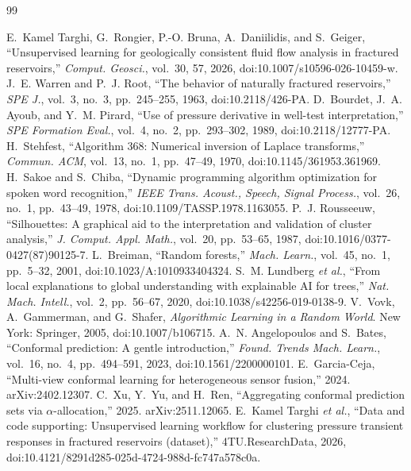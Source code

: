 \documentclass[journal]{IEEEtran}
\begin{document}
\begin{thebibliography}{99}
\itemsep 1pt

 E.~Kamel Targhi, G.~Rongier, P.-O. Bruna, A.~Daniilidis, and S.~Geiger,
``Unsupervised learning for geologically consistent fluid flow analysis in fractured reservoirs,''
\emph{Comput. Geosci.}, vol.~30, 57, 2026, doi:10.1007/s10596-026-10459-w.
 J.~E. Warren and P.~J. Root, ``The behavior of naturally fractured reservoirs,''
\emph{SPE J.}, vol.~3, no.~3, pp.~245--255, 1963, doi:10.2118/426-PA.
 D.~Bourdet, J.~A. Ayoub, and Y.~M. Pirard, ``Use of pressure derivative in
well-test interpretation,'' \emph{SPE Formation Eval.}, vol.~4, no.~2, pp.~293--302, 1989,
doi:10.2118/12777-PA.
 H.~Stehfest, ``Algorithm 368: Numerical inversion of Laplace transforms,''
\emph{Commun. ACM}, vol.~13, no.~1, pp.~47--49, 1970, doi:10.1145/361953.361969.
 H.~Sakoe and S.~Chiba, ``Dynamic programming algorithm optimization for spoken
word recognition,'' \emph{IEEE Trans. Acoust., Speech, Signal Process.}, vol.~26, no.~1,
pp.~43--49, 1978, doi:10.1109/TASSP.1978.1163055.
 P.~J. Rousseeuw, ``Silhouettes: A graphical aid to the interpretation and
validation of cluster analysis,'' \emph{J. Comput. Appl. Math.}, vol.~20, pp.~53--65, 1987,
doi:10.1016/0377-0427(87)90125-7.
 L.~Breiman, ``Random forests,'' \emph{Mach. Learn.}, vol.~45, no.~1,
pp.~5--32, 2001, doi:10.1023/A:1010933404324.
 S.~M. Lundberg \emph{et al.}, ``From local explanations to global
understanding with explainable AI for trees,'' \emph{Nat. Mach. Intell.}, vol.~2, pp.~56--67,
2020, doi:10.1038/s42256-019-0138-9.
 V.~Vovk, A.~Gammerman, and G.~Shafer, \emph{Algorithmic Learning in a Random
World}. New York: Springer, 2005, doi:10.1007/b106715.
 A.~N. Angelopoulos and S.~Bates, ``Conformal prediction: A gentle
introduction,'' \emph{Found. Trends Mach. Learn.}, vol.~16, no.~4, pp.~494--591, 2023,
doi:10.1561/2200000101.
 E.~Garcia-Ceja, ``Multi-view conformal learning for heterogeneous
sensor fusion,'' 2024. arXiv:2402.12307.
 C.~Xu, Y.~Yu, and H.~Ren, ``Aggregating conformal prediction sets via
$\alpha$-allocation,'' 2025. arXiv:2511.12065.
 E.~Kamel Targhi \emph{et al.}, ``Data and code supporting: Unsupervised learning
workflow for clustering pressure transient responses in fractured reservoirs (dataset),''
4TU.ResearchData, 2026,
doi:10.4121/8291d285-025d-4724-988d-fc747a578c0a.

\end{thebibliography}
\end{document}
